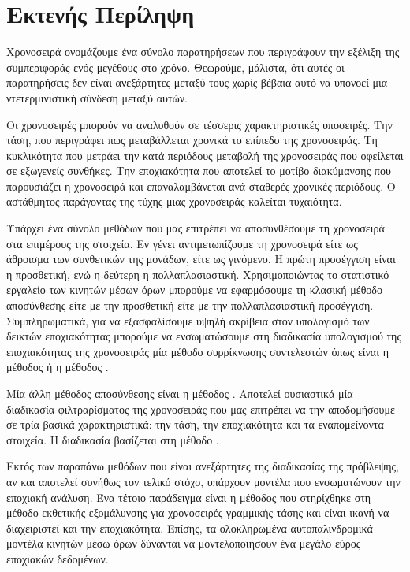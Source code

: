 \chapter{Εκτενής Περίληψη}
\label{chapabst}

Χρονοσειρά ονομάζουμε ένα σύνολο παρατηρήσεων που περιγράφουν την εξέλιξη της συμπεριφοράς ενός μεγέθους στο χρόνο. Θεωρούμε, μάλιστα, ότι αυτές οι παρατηρήσεις δεν είναι ανεξάρτητες μεταξύ τους χωρίς βέβαια αυτό να υπονοεί μια ντετερμινιστική σύνδεση μεταξύ αυτών. 

Οι χρονοσειρές μπορούν να αναλυθούν σε τέσσερις χαρακτηριστικές υποσειρές. Την τάση, που περιγράφει πως μεταβάλλεται χρονικά το επίπεδο της χρονοσειράς. Τη κυκλικότητα που μετράει την κατά περιόδους μεταβολή της χρονοσειράς που οφείλεται σε εξωγενείς συνθήκες. Την εποχιακότητα που αποτελεί το μοτίβο διακύμανσης που παρουσιάζει η χρονοσειρά και επαναλαμβάνεται ανά σταθερές χρονικές περιόδους. Ο αστάθμητος παράγοντας της τύχης μιας χρονοσειράς καλείται τυχαιότητα.

Υπάρχει ένα σύνολο μεθόδων που μας επιτρέπει να αποσυνθέσουμε τη χρονοσειρά στα επιμέρους της στοιχεία. Εν γένει αντιμετωπίζουμε τη χρονοσειρά είτε ως άθροισμα των συνθετικών της μονάδων, είτε ως γινόμενο. Η πρώτη προσέγγιση είναι η προσθετική, ενώ η δεύτερη η πολλαπλασιαστική. Χρησιμοποιώντας το στατιστικό εργαλείο των κινητών μέσων όρων μπορούμε να εφαρμόσουμε τη κλασική μέθοδο αποσύνθεσης είτε με την προσθετική είτε με την πολλαπλασιαστική προσέγγιση. Συμπληρωματικά, για να εξασφαλίσουμε υψηλή ακρίβεια στον υπολογισμό των δεικτών εποχιακότητας μπορούμε να ενσωματώσουμε στη διαδικασία υπολογισμού της εποχιακότητας της χρονοσειράς μία μέθοδο συρρίκνωσης συντελεστών όπως είναι η μέθοδος  ή η μέθοδος .

Μία άλλη μέθοδος αποσύνθεσης είναι η μέθοδος . Αποτελεί ουσιαστικά μία διαδικασία φιλτραρίσματος της χρονοσειράς που μας επιτρέπει να την αποδομήσουμε σε τρία βασικά χαρακτηριστικά: την τάση, την εποχιακότητα και τα εναπομείνοντα στοιχεία. Η διαδικασία βασίζεται στη μέθοδο .

Εκτός των παραπάνω μεθόδων που είναι ανεξάρτητες της διαδικασίας της πρόβλεψης, αν και αποτελεί συνήθως τον τελικό στόχο, υπάρχουν μοντέλα που ενσωματώνουν την εποχιακή ανάλυση. Ένα τέτοιο παράδειγμα είναι η μέθοδος  που στηρίχθηκε στη μέθοδο εκθετικής εξομάλυνσης για χρονοσειρές γραμμικής τάσης και είναι ικανή να διαχειριστεί και την εποχιακότητα. Επίσης, τα ολοκληρωμένα αυτοπαλινδρομικά μοντέλα κινητών μέσω όρων  δύνανται να μοντελοποιήσουν ένα μεγάλο εύρος εποχιακών δεδομένων.

